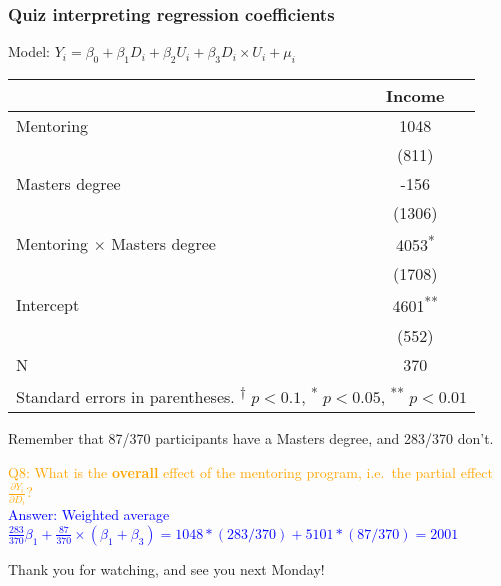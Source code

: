 \documentclass[12pt,english,dvipsnames,aspectratio=169,handout]{beamer}\usepackage[]{graphicx}\usepackage[]{xcolor}
\begin{document}
\begin{frame}
	\frametitle{Quiz interpreting regression coefficients}
\centering
\tiny
Model: ${Y}_i = \beta_0 + \beta_1 D_i + \beta_2 U_i + \beta_3 D_i\times U_i + \mu_i$

\scriptsize
\begin{tabular}{l*{1}{c}}
\toprule
          &\multicolumn{1}{c}{Income}\\
\midrule
Mentoring     &     1048        \\
          &    (811)        \\
Masters degree    &     -156        \\
          &   (1306)        \\
Mentoring $\times$ Masters degree &    4053\textsuperscript{*} \\
          &   (1708)        \\
Intercept    &     4601\textsuperscript{**}\\
          &    (552)        \\
\midrule
N         &      370        \\
\bottomrule
\multicolumn{2}{l}{Standard errors in parentheses. \textsuperscript{†} \(p<0.1\), \textsuperscript{*} \(p<0.05\), \textsuperscript{**} \(p<0.01\)}\\
\end{tabular}

\tiny{Remember that 87/370 participants have a Masters degree, and 283/370 don't.}
\scriptsize\flushleft

\textcolor{orange}{Q8: What is the \textbf{overall} effect of the mentoring program, i.e.\ the partial effect $\frac{\partial Y_i}{\partial D_i}$?}\\
\textcolor{blue}{Answer: Weighted average $\frac{283}{370}\beta_1 + \frac{87}{370}\times (\beta_1 + \beta_3) = 1048*(283/370)+5101*(87/370)=2001$}

\end{frame}


\begin{frame}
\begin{center}
    \LARGE Thank you for watching, and see you next Monday!
\end{center}
\end{frame}
\end{document}
